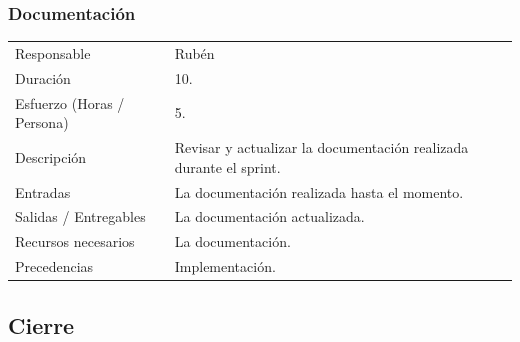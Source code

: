 \subsubsection{Documentaci\'{o}n}
\begin{table}[H]
    \begin{center}
        \begin{tabular}{l p{8cm}}
            Responsable                           & Rub\'{e}n \\
            Duraci\'{o}n                          & 10. \\ 
            Esfuerzo (Horas / Persona)            & 5. \\
            Descripci\'{o}n                       & Revisar y actualizar la documentaci\'{o}n realizada durante el sprint. \\
            Entradas                              & La documentaci\'{o}n realizada hasta el momento.\\
            Salidas / Entregables                 & La documentaci\'{o}n actualizada. \\
            Recursos necesarios                   & La documentaci\'{o}n. \\
            Precedencias                          & Implementaci\'{o}n. \\
        \end{tabular}
    \end{center}
    
\end{table}

\subsection{Cierre}
